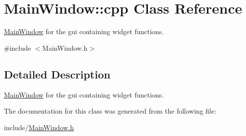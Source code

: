 \hypertarget{classMainWindow_1_1cpp}{
\section{MainWindow::cpp Class Reference}
\label{classMainWindow_1_1cpp}
}


\hyperlink{classMainWindow}{MainWindow} for the gui containing widget functions.  


{\ttfamily \#include $<$MainWindow.h$>$}

\subsection{Detailed Description}
\hyperlink{classMainWindow}{MainWindow} for the gui containing widget functions. 

The documentation for this class was generated from the following file:\begin{DoxyCompactItemize}
\item 
include/\hyperlink{MainWindow_8h}{MainWindow.h}\end{DoxyCompactItemize}
